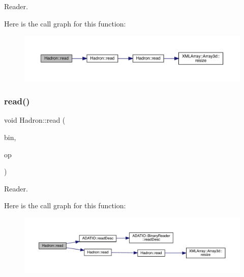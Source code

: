 Reader. 

Here is the call graph for this function\+:\nopagebreak
\begin{figure}[H]
\begin{center}
\leavevmode
\includegraphics[width=350pt]{d1/daf/namespaceHadron_a3b1ec7d213815eedf06fcd0e518eb5d3_cgraph}
\end{center}
\end{figure}
\mbox{\label{namespaceHadron_afc23e5e61669cc277e94a613ee812b0f}} 
\subsubsection{\texorpdfstring{read()}{read()}\hspace{0.1cm}{\footnotesize\ttfamily [94/94]}}
{\footnotesize\ttfamily void Hadron\+::read (\begin{DoxyParamCaption}\item[{\mbox{\hyperlink{classADATIO_1_1BinaryReader}{Binary\+Reader}} \&}]{bin,  }\item[{\mbox{\hyperlink{structHadron_1_1KeySingleHadronQuarkFlavorColor__t}{Key\+Single\+Hadron\+Quark\+Flavor\+Color\+\_\+t}} \&}]{op }\end{DoxyParamCaption})}



Reader. 

Here is the call graph for this function\+:\nopagebreak
\begin{figure}[H]
\begin{center}
\leavevmode
\includegraphics[width=350pt]{d1/daf/namespaceHadron_afc23e5e61669cc277e94a613ee812b0f_cgraph}
\end{center}
\end{figure}
\mbox{\label{namespaceHadron_a8a4e39ac150585731d18fb970ec8a1bd}} 
